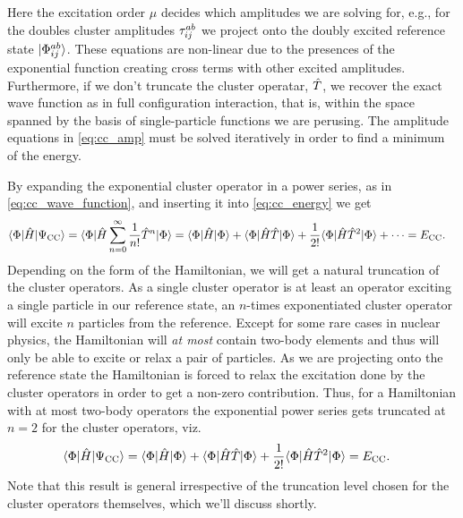         Here the excitation order $\mu$ decides which amplitudes we are solving
        for, e.g., for the doubles cluster amplitudes $\tau^{ab}_{ij}$ we
        project onto the doubly excited reference state $| \Phi^{ab}_{ij} \rangle$.
        These equations are non-linear due to the presences of the exponential
        function creating cross terms with other excited amplitudes.
        Furthermore, if we don't truncate the cluster operatar, $\hat{T}$, we
        recover the exact wave function as in full configuration interaction,
        that is, within the space spanned by the basis of single-particle
        functions we are perusing.
        The amplitude equations in \autoref{eq:cc_amp} must be solved
        iteratively in order to find a minimum of the energy.

        By expanding the exponential cluster operator in a power series, as in
        \autoref{eq:cc_wave_function}, and inserting it into
        \autoref{eq:cc_energy} we get
        \begin{align}
            \langle \Phi |\hat{H} | \Psi_{\text{CC}} \rangle
            &=
            \langle \Phi |\hat{H}
            \sum_{n = 0}^{\infty} \frac{1}{n!}\hat{T}^n
            | \Phi \rangle
            =
            \langle \Phi |\hat{H}| \Phi \rangle
            + \langle \Phi |\hat{H} \hat{T} | \Phi \rangle
            + \frac{1}{2!}
            \langle \Phi | \hat{H} \hat{T}^2 | \Phi \rangle
            + \dots
            = E_{\text{CC}}.
        \end{align}
        Depending on the form of the Hamiltonian, we will get a natural
        truncation of the cluster operators.
        As a single cluster operator is at
        least an operator exciting a single particle in our reference state, an
        $n$-times exponentiated cluster operator will excite $n$ particles from
        the reference.
        Except for some rare cases in nuclear physics,
        the Hamiltonian will \emph{at most} contain two-body elements and thus
        will only be able to excite or relax a pair of particles.
        As we are projecting onto the reference state the Hamiltonian is forced
        to relax the excitation done by the cluster operators in order to get a
        non-zero contribution.
        Thus, for a Hamiltonian with at most two-body operators the exponential
        power series gets truncated at $n = 2$ for the cluster operators, viz.
        \begin{align}
            \langle \Phi |\hat{H} | \Psi_{\text{CC}} \rangle
            &=
            \langle \Phi |\hat{H}| \Phi \rangle
            + \langle \Phi |\hat{H} \hat{T} | \Phi \rangle
            + \frac{1}{2!}
            \langle \Phi | \hat{H} \hat{T}^2 | \Phi \rangle
            = E_{\text{CC}}.
        \end{align}
        Note that this result is general irrespective of the truncation level
        chosen for the cluster operators themselves, which we'll discuss
        shortly.

